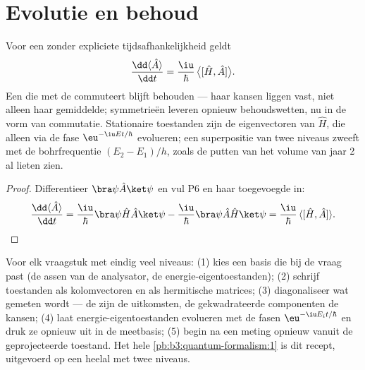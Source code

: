 \section{Evolutie en behoud}

\begin{proposition}\label{prop:b3:quantum-formalism:evolution}
Voor een  zonder expliciete tijdsafhankelijkheid geldt
\[
\frac{\dd\langle\hat A\rangle}{\dd t}
 = \frac{\iu}{\hbar}\,\big\langle[\hat H, \hat A]\big\rangle .
\]
Een  die met de  commuteert blijft behouden --- haar
kansen liggen vast, niet alleen haar gemiddelde; symmetrieën leveren
opnieuw behoudswetten, nu in de vorm van commutatie. Stationaire toestanden
zijn de eigenvectoren van $\hat H$, die alleen via de fase
$\eu^{-\iu Et/\hbar}$ evolueren; een superpositie van twee niveaus zweeft
met de bohrfrequentie $(E_2 - E_1)/h$, zoals de putten van het volume van
jaar 2 al lieten zien.
\end{proposition}

\begin{proof}
Differentieer $\bra\psi\hat A\ket\psi$ en vul P6 en haar toegevoegde in:
\[
\frac{\dd\langle\hat A\rangle}{\dd t}
 = \frac{\iu}{\hbar}\bra\psi\hat H\hat A\ket\psi
 - \frac{\iu}{\hbar}\bra\psi\hat A\hat H\ket\psi
 = \frac{\iu}{\hbar}\,\langle[\hat H, \hat A]\rangle .
\qedhere
\]
\end{proof}

\begin{method}\label{met:b3:quantum-formalism:method}
Voor elk vraagstuk met eindig veel niveaus: (1) kies een basis die bij de
vraag past (de assen van de analysator, de energie-eigentoestanden); (2)
schrijf toestanden als kolomvectoren en  als hermitische
matrices; (3) diagonaliseer wat gemeten wordt --- de  zijn de
uitkomsten, de gekwadrateerde componenten de kansen; (4) laat
energie-eigentoestanden evolueren met de fasen $\eu^{-\iu E_it/\hbar}$ en
druk ze opnieuw uit in de meetbasis; (5) begin na een meting opnieuw
vanuit de geprojecteerde toestand. Het hele
\cref{pb:b3:quantum-formalism:1} is dit recept, uitgevoerd op een heelal
met twee niveaus.
\end{method}

